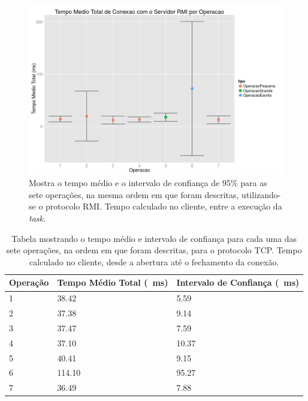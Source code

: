 \documentclass[12pt,a4paper]{article}
\begin{document}
\begin{figure}[h]
\centering
\includegraphics[width=\textwidth]{resultadosTempoTotalRMI.png}
\caption{Mostra o tempo médio e o intervalo de confiança de 95\% para as sete operações, na mesma ordem em que foram descritas, utilizando-se o protocolo RMI. Tempo calculado no cliente, entre a execução da {\it task}.}
\label{fig:totalR}
\end{figure}

\begin{table}[h]
\centering
\caption{Tabela mostrando o tempo médio e intervalo de confiança para cada uma das sete operações, na ordem em que foram descritas, para o protocolo TCP. Tempo calculado no cliente, desde a abertura até o fechamento da conexão.}
\label{table:totalT}
\begin{tabular}{lll}
Operação & Tempo Médio Total (\SI{}{\milli\second}) & Intervalo de Confiança (\SI{}{\milli\second})\\ \hline
1        & 38.42           & 5.59   \\
2        & 37.38           & 9.14   \\
3        & 37.47           & 7.59   \\
4        & 37.10           & 10.37  \\
5        & 40.41           & 9.15   \\
6        & 114.10          & 95.27  \\
7        & 36.49           & 7.88  
\end{tabular}
\end{table}
\end{document}
